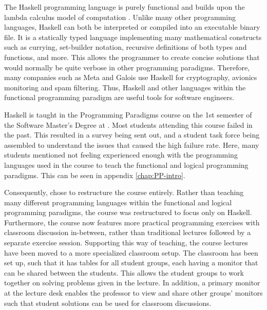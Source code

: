 The Haskell programming language is purely functional\cite{Haskell_landing} and builds upon the lambda calculus model of computation \cite{Haskell_book}.
Unlike many other programming languages, Haskell can both be interpreted or compiled into an executable binary file.
It is a statically typed language implementing many mathematical constructs such as currying, set-builder notation, recursive definitions of both types and functions, and more.
This allows the programmer to create concise solutions that would normally be quite verbose in other programming paradigms.
Therefore, many companies such as Meta and Galois use Haskell for cryptography, avionics monitoring and spam filtering\cite{Haskell_companies}.
Thus, Haskell and other languages within the functional programming paradigm are useful tools for software engineers.


Haskell is taught in the Programming Paradigms course on the 1st semester of the Software Master's Degree at \aau{}.
Most students attending this course failed in the past.
This resulted in a survey being sent out, and a student task force being assembled to understand the issues that caused the high failure rate.
Here, many students mentioned not feeling experienced enough with the programming languages used in the course to teach the functional and logical programming paradigms. This can be seen in appendix \ref{chap:PP-intro}.


Consequently, \aau{} chose to restructure the course entirely.
Rather than teaching many different programming languages within the functional and logical programming paradigms, the course was restructured to focus only on Haskell.
Furthermore, the course now features more practical programming exercises with classroom discussion in-between, rather than traditional lectures followed by a separate exercise session.
Supporting this way of teaching, the course lectures have been moved to a more specialized classroom setup. The classroom has been set up, such that it has tables for all student groups, each having a monitor that can be shared between the students. This allows the student groups to work together on solving problems given in the lecture.
In addition, a primary monitor at the lecture desk enables the professor to view and share other groups' monitors such that student solutions can be used for classroom discussions.


